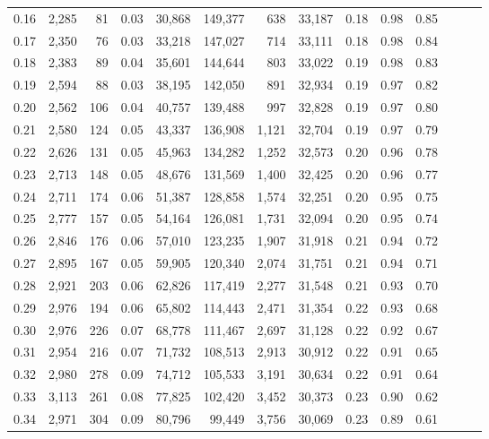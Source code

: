 \begin{tabular}{rrrrrrrrrrrrrr}
0.16 &  2,285 &     81 &  0.03 &   30,868 &  149,377 &     638 &  33,187 &  0.18 &  0.98 &      0.85 \\
0.17 &  2,350 &     76 &  0.03 &   33,218 &  147,027 &     714 &  33,111 &  0.18 &  0.98 &      0.84 \\
0.18 &  2,383 &     89 &  0.04 &   35,601 &  144,644 &     803 &  33,022 &  0.19 &  0.98 &      0.83 \\
0.19 &  2,594 &     88 &  0.03 &   38,195 &  142,050 &     891 &  32,934 &  0.19 &  0.97 &      0.82 \\
0.20 &  2,562 &    106 &  0.04 &   40,757 &  139,488 &     997 &  32,828 &  0.19 &  0.97 &      0.80 \\
0.21 &  2,580 &    124 &  0.05 &   43,337 &  136,908 &   1,121 &  32,704 &  0.19 &  0.97 &      0.79 \\
0.22 &  2,626 &    131 &  0.05 &   45,963 &  134,282 &   1,252 &  32,573 &  0.20 &  0.96 &      0.78 \\
0.23 &  2,713 &    148 &  0.05 &   48,676 &  131,569 &   1,400 &  32,425 &  0.20 &  0.96 &      0.77 \\
0.24 &  2,711 &    174 &  0.06 &   51,387 &  128,858 &   1,574 &  32,251 &  0.20 &  0.95 &      0.75 \\
0.25 &  2,777 &    157 &  0.05 &   54,164 &  126,081 &   1,731 &  32,094 &  0.20 &  0.95 &      0.74 \\
0.26 &  2,846 &    176 &  0.06 &   57,010 &  123,235 &   1,907 &  31,918 &  0.21 &  0.94 &      0.72 \\
0.27 &  2,895 &    167 &  0.05 &   59,905 &  120,340 &   2,074 &  31,751 &  0.21 &  0.94 &      0.71 \\
0.28 &  2,921 &    203 &  0.06 &   62,826 &  117,419 &   2,277 &  31,548 &  0.21 &  0.93 &      0.70 \\
0.29 &  2,976 &    194 &  0.06 &   65,802 &  114,443 &   2,471 &  31,354 &  0.22 &  0.93 &      0.68 \\
0.30 &  2,976 &    226 &  0.07 &   68,778 &  111,467 &   2,697 &  31,128 &  0.22 &  0.92 &      0.67 \\
0.31 &  2,954 &    216 &  0.07 &   71,732 &  108,513 &   2,913 &  30,912 &  0.22 &  0.91 &      0.65 \\
0.32 &  2,980 &    278 &  0.09 &   74,712 &  105,533 &   3,191 &  30,634 &  0.22 &  0.91 &      0.64 \\
0.33 &  3,113 &    261 &  0.08 &   77,825 &  102,420 &   3,452 &  30,373 &  0.23 &  0.90 &      0.62 \\
0.34 &  2,971 &    304 &  0.09 &   80,796 &   99,449 &   3,756 &  30,069 &  0.23 &  0.89 &      0.61 \\

\end{tabular}
